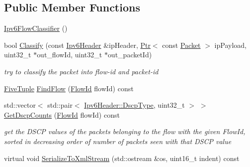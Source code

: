 \subsection*{Public Member Functions}
\begin{DoxyCompactItemize}
\item 
\hyperlink{classns3_1_1Ipv6FlowClassifier_a6610840238be8282854d6425bb39b2e3}{Ipv6\+Flow\+Classifier} ()
\item 
bool \hyperlink{classns3_1_1Ipv6FlowClassifier_ac91b39dfc99ca7190e6b0b8e3d37d7a9}{Classify} (const \hyperlink{classns3_1_1Ipv6Header}{Ipv6\+Header} \&ip\+Header, \hyperlink{classns3_1_1Ptr}{Ptr}$<$ const \hyperlink{classns3_1_1Packet}{Packet} $>$ ip\+Payload, uint32\+\_\+t $\ast$out\+\_\+flow\+Id, uint32\+\_\+t $\ast$out\+\_\+packet\+Id)
\begin{DoxyCompactList}\small\item\em try to classify the packet into flow-\/id and packet-\/id \end{DoxyCompactList}\item 
\hyperlink{structns3_1_1Ipv6FlowClassifier_1_1FiveTuple}{Five\+Tuple} \hyperlink{classns3_1_1Ipv6FlowClassifier_a8d1f460cd4a07e559430d1d7ab9cd9c6}{Find\+Flow} (\hyperlink{group__flow-monitor_ga39a766c4a370cdb9ab8ac85da4b288e9}{Flow\+Id} flow\+Id) const 
\item 
std\+::vector$<$ std\+::pair$<$ \hyperlink{classns3_1_1Ipv6Header_afdc89ed9acd990a7613782323e4c95ee}{Ipv6\+Header\+::\+Dscp\+Type}, uint32\+\_\+t $>$ $>$ \hyperlink{classns3_1_1Ipv6FlowClassifier_aa529a3600f6198f3b5093f590ee4fba4}{Get\+Dscp\+Counts} (\hyperlink{group__flow-monitor_ga39a766c4a370cdb9ab8ac85da4b288e9}{Flow\+Id} flow\+Id) const 
\begin{DoxyCompactList}\small\item\em get the D\+S\+CP values of the packets belonging to the flow with the given Flow\+Id, sorted in decreasing order of number of packets seen with that D\+S\+CP value \end{DoxyCompactList}\item 
virtual void \hyperlink{classns3_1_1Ipv6FlowClassifier_a4ffab8c7d4a16cc9c5b941c9b8550fae}{Serialize\+To\+Xml\+Stream} (std\+::ostream \&os, uint16\+\_\+t indent) const 
\end{DoxyCompactItemize}

